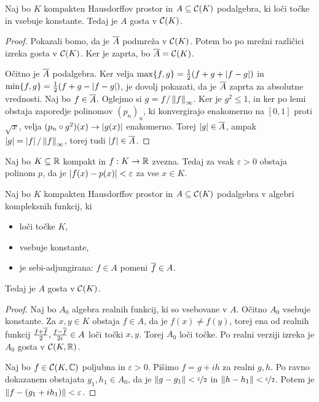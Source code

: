 \begin{izrek}
  Naj bo $K$ kompakten Hausdorffov prostor in $A \subseteq \mathcal{C}(K)$
  podalgebra, ki loči točke in vsebuje konstante.
  Tedaj je $A$ gosta v $\mathcal{C}(K)$.
\end{izrek}

\begin{proof}
  Pokazali bomo, da je $\overline{A}$ podmreža v $\mathcal{C}(K)$.
  Potem bo po mrežni različici izreka gosta v $\mathcal{C}(K)$.
  Ker je zaprta, bo $\overline{A} = \mathcal{C}(K)$.

  Očitno je $\overline{A}$ podalgebra.
  Ker velja $\max\{f,g\} = \frac{1}{2} (f + g + \left| f-g \right|)$ in $\min\{f,g\} = \frac{1}{2}(f+g
  - \left| f-g \right|)$, je dovolj pokazati, da je $\overline{A}$ zaprta za absolutne
  vrednosti.
  Naj bo $f \in \overline{A}$.
  Oglejmo si $g = f / \left\lVert f\right\rVert_\infty$.
  Ker je $g^2 \le 1$, in ker po lemi obstaja zaporedje polinomov $(p_n)_n$, ki
  konvergirajo enakomerno na $[0,1]$ proti $\sqrt{x}$, velja $(p_n \circ g^2)(x)
  \to \left| g(x) \right|$ enakomerno.
  Torej $\left| g \right| \in \overline{A}$, ampak $\left| g \right| = \left| f \right| / \left\lVert f\right\rVert_\infty$, torej
  tudi $\left| f \right| \in \overline{A}$.
\end{proof}


\begin{izrek}[Weierstrass]
  Naj bo $K \subseteq \mathbb{R}$ kompakt in $f: K \to \mathbb{R}$ zvezna.
  Tedaj za vsak $\varepsilon > 0$ obstaja polinom $p$, da je $\left| f(x) - p(x) \right|
  < \varepsilon$ za vse $x \in K$.
\end{izrek}


\begin{izrek}
  Naj bo $K$ kompakten Hausdorffov prostor in $A \subseteq \mathcal{C}(K)$
  podalgebra v algebri kompleksnih funkcij, ki
  \begin{itemize}
  \item loči točke $K$,
  \item vsebuje konstante,
  \item je sebi-adjungirana: $f \in A$ pomeni $\overline{f} \in A$.
  \end{itemize}
  Tedaj je $A$ gosta v $\mathcal{C}(K)$.
\end{izrek}

\begin{proof}
  Naj bo $A_0$ algebra realnih funkcij, ki so vsebovane v $A$.
  Očitno $A_0$ vsebuje konstante.
  Za $x, y \in K$ obstaja $f \in A$, da je $f(x) \ne f(y)$, torej ena od realnih
  funkcij $\frac{f+\overline{f}}{2}, \frac{f-\overline{f}}{2i} \in A$ loči točki $x, y$.
  Torej $A_0$ loči točke.
  Po realni verziji izreka je $A_0$ gosta v $\mathcal{C}(K, \mathbb{R})$.

  Naj bo $f \in \mathcal{C}(K, \mathbb{C})$ poljubna in $\varepsilon >0$.
  Pišimo $f = g + ih$ za realni $g, h$.
  Po ravno dokazanem obstajata $g_1, h_1 \in A_0$, da je $\left\lVert g - g_1\right\rVert <
  \nicefrac{\varepsilon}{2}$ in $\left\lVert h-h_1\right\rVert < \nicefrac{\varepsilon}{2}$.
  Potem je $\left\lVert f - (g_1 + i h_1)\right\rVert < \varepsilon$.
\end{proof}

